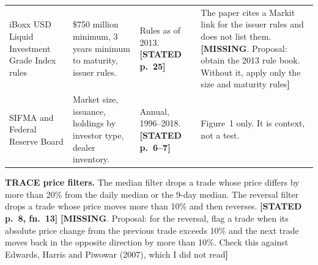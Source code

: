 \documentclass[10pt,a4paper]{article}
\newcommand{\ST}[1]{\textcolor{cst}{\textbf{[STATED #1]}}}
\newcommand{\MI}[1]{\textcolor{cmi}{\textbf{[MISSING}. Proposal: #1\textbf{]}}}
\begin{document}
\begin{longtable}{@{}P{2.3cm}P{5cm}P{3cm}P{6.3cm}@{}}
iBoxx USD Liquid Investment Grade Index rules & \$750 million minimum, 3 years minimum to maturity, issuer rules. & Rules as of 2013. \ST{p.~25} & The paper cites a Markit link for the issuer rules and does not list them. \MI{obtain the 2013 rule book. Without it, apply only the size and maturity rules}\\
SIFMA and Federal Reserve Board & Market size, issuance, holdings by investor type, dealer inventory. & Annual, 1996--2018. \ST{p.~6--7} & Figure~1 only. It is context, not a test.\\
\bottomrule
\end{longtable}

\textbf{TRACE price filters.} The median filter drops a trade whose price differs by more than 20\% from the daily median or the 9-day median. The reversal filter drops a trade whose price moves more than 10\% and then reverses. \ST{p.~8, fn.~13} \MI{for the reversal, flag a trade when its absolute price change from the previous trade exceeds 10\% and the next trade moves back in the opposite direction by more than 10\%. Check this against Edwards, Harris and Piwowar (2007), which I did not read}
\end{document}
